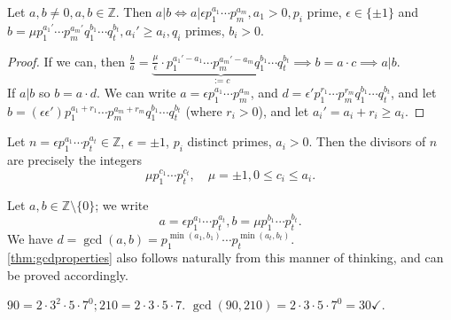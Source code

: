 \documentclass[12pt,oneside]{article}
\begin{document}
\begin{proposition}
  Let $a,b \neq 0, a,b \in \mathbb{Z}$. Then $a|b \iff a| \epsilon p_1^{a_1} \cdots p_m^{a_m}, a_1 > 0, p_i$ prime, $\epsilon \in \{\pm 1\}$ and $b = \mu p_1^{a_1'} \cdots p_m^{a_m'}q_1^{b_1}\cdots q_t^{b_t},a_i' \geq a_i, q_i$ primes, $b_i > 0$.
\end{proposition}

\begin{proof}
  If we can, then $\frac{b}{a} = \underbrace{\frac{\mu}{\epsilon} \cdot p_1^{a_1'-a_1}\cdots p_m^{a_m'-a_m}q_1^{b_1}\cdots q_t^{b_t}}_{:=c} \implies b = a \cdot c \implies a|b$.\\
  If $a|b$ so $b = a \cdot d$. We can write $a = \epsilon p_1^{a_1}\cdots p_m^{a_m}$, and $d = \epsilon' p_1^{r_1}\cdots p_m^{r_m}q_1^{b_1}\cdots q_t^{b_t}$, and let $b = (\epsilon \epsilon ')p_1^{a_1 + r_1} \cdots p_m^{a_m+r_m} q_1^{b_1}\cdots q_t^{b_t}$ (where $r_i > 0$), and let $a_i' = a_i+r_i \geq a_i$.
\end{proof}

\begin{corollary}
  Let $n = \epsilon p_1^{a_1}\cdots p_t^{a_t} \in \mathbb{Z}$, $\epsilon = \pm 1$, $p_i$ distinct primes, $a_i > 0$. Then the divisors of $n$ are precisely the integers \[\mu p_1^{c_1}\cdots p_t^{c_t}, \quad \mu = \pm 1, 0 \leq c_i \leq a_i.\]
\end{corollary}

\begin{remark}
  Let $a,b \in \mathbb{Z}\setminus \{0\}$; we write \[a = \epsilon p_1 ^{a_1} \cdots p_t^{a_t}, b = \mu p_1^{b_1}\cdots p_t^{b_t}.\] We have $d = \gcd(a,b) = p_1^{\min(a_1,b_1)}\cdots p_t^{\min(a_t,b_t)}$.\\
  \cref{thm:gcdproperties} also follows naturally from this manner of thinking, and can be proved accordingly.
\end{remark}

\begin{example}
  $90 = 2 \cdot 3^2 \cdot 5 \cdot 7^0; 210 = 2 \cdot 3 \cdot 5 \cdot 7$. $\gcd(90,210) = 2 \cdot 3 \cdot 5 \cdot 7^0 = 30\checkmark$.
\end{example}












\newpage
\end{document}
